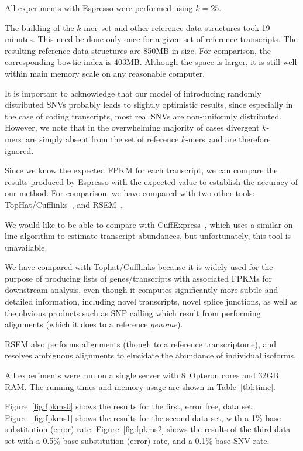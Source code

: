 \documentclass{bioinfo}
\newcommand{\Espresso}{Espresso}
\newcommand{\kmer}{$k$-mer{}}
\newcommand{\kmers}{$k$-mers{}}
\begin{document}
All experiments with \Espresso{} were performed using $k=25$.

The building of the \kmer\ set and other reference data structures took 19 minutes.
This need be done only once for a given set of reference transcripts.
The resulting reference data structures are 850MB in size.
For comparison, the corresponding bowtie index is 403MB.
Although the space is larger, it is still well within main memory scale on any
reasonable computer.

It is important to acknowledge that our model of introducing randomly
distributed SNVs probably leads to slightly optimistic results,
since especially in the case of coding transcripts, most real SNVs
are non-uniformly distributed.
However, we note that in the overwhelming majority of cases divergent
\kmers\ are simply absent from the set of reference \kmers\ and are
therefore ignored.

Since we know the expected FPKM for each transcript,
we can compare the results produced by \Espresso{} with the expected
value to establish the accuracy of our method. For comparison, we
have compared with two other tools: TopHat/Cufflinks~\citep{Trapnell:2010},
and RSEM~\citep{Li:2010}.

We would like to be able to compare with CuffExpress~\citep{Roberts:2011},
which uses a similar on-line algorithm to estimate transcript abundances,
but unfortunately, this tool is unavailable.

We have compared with Tophat/Cufflinks because it is widely used
for the purpose of producing lists of genes/transcripts with
associated FPKMs for downstream analysis, even though it computes
significantly more subtle and detailed information, including novel
transcripts, novel splice junctions, as well as the obvious products
such as SNP calling which result from performing alignments (which it does to a reference
\textit{genome}).

RSEM also performs alignments (though to a reference transcriptome), and
resolves ambiguous alignments to elucidate the abundance of individual isoforms.

All experiments were run on a single server with 8~Opteron cores and 32GB RAM.
The running times and memory usage are shown in Table~\ref{tbl:time}.

Figure~\ref{fig:fpkms0} shows the results for the first, error free, data set.
Figure~\ref{fig:fpkms1} shows the results for the second data set, with a 1\%
base substitution (error) rate.
Figure~\ref{fig:fpkms2} shows the results of the third data set with a 0.5\% base substitution
(error) rate, and a 0.1\% base SNV rate.
\end{document}
